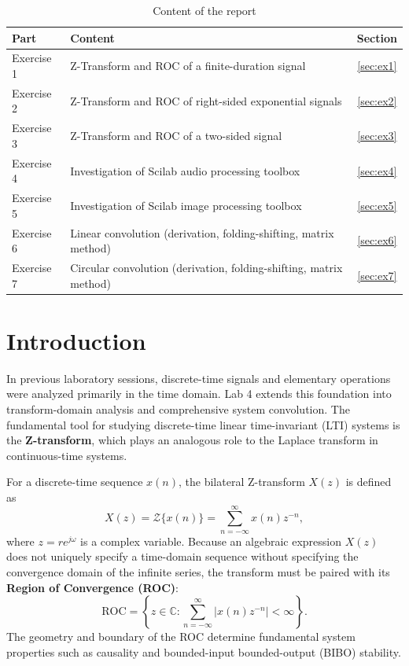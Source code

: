 \documentclass[12pt,a4paper]{article}
\begin{document}
\begin{table}[H]
    \centering
    \caption{Content of the report}
    \begin{tabular}{|l|l|c|}
        \hline
        \rowcolor{headergray}\textbf{Part} & \textbf{Content} & \textbf{Section} \\ \hline
        Exercise 1 & Z-Transform and ROC of a finite-duration signal               & \ref{sec:ex1} \\ \hline
        Exercise 2 & Z-Transform and ROC of right-sided exponential signals       & \ref{sec:ex2} \\ \hline
        Exercise 3 & Z-Transform and ROC of a two-sided signal                   & \ref{sec:ex3} \\ \hline
        Exercise 4 & Investigation of Scilab audio processing toolbox            & \ref{sec:ex4} \\ \hline
        Exercise 5 & Investigation of Scilab image processing toolbox             & \ref{sec:ex5} \\ \hline
        Exercise 6 & Linear convolution (derivation, folding-shifting, matrix method) & \ref{sec:ex6} \\ \hline
        Exercise 7 & Circular convolution (derivation, folding-shifting, matrix method) & \ref{sec:ex7} \\ \hline
    \end{tabular}
\end{table}

\section{Introduction}
In previous laboratory sessions, discrete-time signals and elementary operations were analyzed primarily in the time domain. Lab 4 extends this foundation into transform-domain analysis and comprehensive system convolution. The fundamental tool for studying discrete-time linear time-invariant (LTI) systems is the \textbf{Z-transform}, which plays an analogous role to the Laplace transform in continuous-time systems.

For a discrete-time sequence $x(n)$, the bilateral Z-transform $X(z)$ is defined as
\begin{equation}
    X(z) = \mathcal{Z}\{x(n)\} = \sum_{n=-\infty}^{\infty} x(n) z^{-n},
    \label{eq:ztransform}
\end{equation}
where $z = r e^{j\omega}$ is a complex variable. Because an algebraic expression $X(z)$ does not uniquely specify a time-domain sequence without specifying the convergence domain of the infinite series, the transform must be paired with its \textbf{Region of Convergence (ROC)}:
\begin{equation}
    \text{ROC} = \left\{ z \in \mathbb{C} : \sum_{n=-\infty}^{\infty} |x(n) z^{-n}| < \infty \right\}.
    \label{eq:roc}
\end{equation}
The geometry and boundary of the ROC determine fundamental system properties such as causality and bounded-input bounded-output (BIBO) stability.
\end{document}

